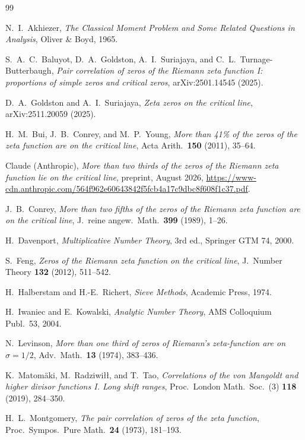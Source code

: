 \documentclass[11pt]{article}
\numberwithin{equation}{section}
\theoremstyle{definition}
\theoremstyle{remark}
\begin{document}
\begin{thebibliography}{99}

 N.~I.~Akhiezer, \emph{The Classical Moment
Problem and Some Related Questions in Analysis}, Oliver \&
Boyd, 1965.

 S.~A.~C.~Baluyot, D.~A.~Goldston,
A.~I.~Suriajaya, and C.~L.~Turnage-Butterbaugh, \emph{Pair
correlation of zeros of the Riemann zeta function I: proportions
of simple zeros and critical zeros}, arXiv:2501.14545 (2025).

 D.~A.~Goldston and A.~I.~Suriajaya, \emph{Zeta zeros
on the critical line}, arXiv:2511.20059 (2025).

 H.~M.~Bui, J.~B.~Conrey, and M.~P.~Young,
\emph{More than 41\% of the zeros of the zeta function are on the
critical line}, Acta Arith.\ \textbf{150} (2011), 35--64.

 Claude (Anthropic), \emph{More than two thirds
of the zeros of the Riemann zeta function lie on the critical
line}, preprint, August 2026,
\url{https://www-cdn.anthropic.com/564f962e60643842f5fcb4a17c9dbc8f608f1c37.pdf}.

 J.~B.~Conrey, \emph{More than two fifths of the
zeros of the Riemann zeta function are on the critical line},
J.\ reine angew.\ Math.\ \textbf{399} (1989), 1--26.

 H.~Davenport, \emph{Multiplicative Number Theory},
3rd ed., Springer GTM 74, 2000.

 S.~Feng, \emph{Zeros of the Riemann zeta function
on the critical line}, J.\ Number Theory \textbf{132} (2012),
511--542.

 H.~Halberstam and H.-E.~Richert, \emph{Sieve
Methods}, Academic Press, 1974.

 H.~Iwaniec and E.~Kowalski, \emph{Analytic Number
Theory}, AMS Colloquium Publ.\ 53, 2004.

 N.~Levinson, \emph{More than one third of zeros
of Riemann's zeta-function are on $\sigma=1/2$}, Adv.\ Math.\
\textbf{13} (1974), 383--436.

 K.~Matom\"aki, M.~Radziwi\l{}\l, and T.~Tao,
\emph{Correlations of the von Mangoldt and higher divisor
functions I. Long shift ranges}, Proc.\ London Math.\ Soc.\ (3)
\textbf{118} (2019), 284--350.

 H.~L.~Montgomery, \emph{The pair correlation of
zeros of the zeta function}, Proc.\ Sympos.\ Pure Math.\
\textbf{24} (1973), 181--193.


\end{thebibliography}
\end{document}
